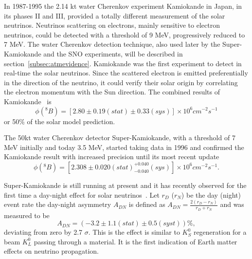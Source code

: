 In 1987-1995 the 2.14 kt water Cherenkov experiment Kamiokande in Japan, in its phases II and III, provided a totally different measurement of the solar neutrinos. Neutrinos scattering on electrons, mainly sensitive to electron neutrinos, could be detected with a threshold of 9 MeV, progressively reduced to 7 MeV.  
The water Cherenkov detection technique, also used later by the Super-Kamiokande and the SNO experiments, will be described in section~\ref{subsec:atmevidence}.   
Kamiokande was the first experiment to detect in real-time the solar neutrinos. Since the scattered electron is emitted preferentially in the direction of the neutrino, it could verify their solar origin by correlating the electron momentum with the Sun direction. The combined results of Kamiokande~\cite{fukuda} is
\begin{equation}
\phi( ^8 B) = [2.80 \pm 0.19 (stat) \pm 0.33 (sys)] \times 10^6 cm^{-2} s^{-1}
\end{equation}
or 50\% of the solar model prediction.

The 50kt water Cherenkov detector Super-Kamiokande, with a threshold of 7 MeV initially and today 3.5 MeV, started taking data in 1996 and confirmed the Kamiokande result with increased precision until its most recent update~\cite{abesk4}
\begin{equation}
\phi( ^8 B) = [2.308 \pm 0.020 (stat) ^{+0.040}_{-0.040} (sys)] \times 10^6 cm^{-2} s^{-1}.
\end{equation} 

Super-Kamiokande is still running at present and it has recently observed for the first time a day-night effect for solar neutrinos~\cite{renshaw}. 
Let $r_D$ ($r_N$) be the day (night) event rate
the day-night asymmetry $A_{DN}$ is defined as $A_{DN} = \frac{2 (r_D - r_N) }{r_D + r_N}$ and was measured to be
\begin{equation}
A_{DN} = (−3.2 \pm 1.1 (stat) \pm 0.5 (syst)) \%,
\end{equation} 
deviating from zero by 2.7 $\sigma$.
This is the effect is similar to $K_S^0$ regeneration for a beam $K_L^0$ passing through a material. It is the first indication of Earth matter effects on neutrino propagation. 


